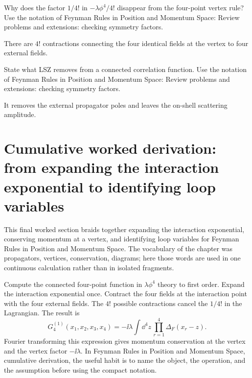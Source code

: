 \begin{exercise}
Why does the factor \(1/4!\) in \(-\lambda\phi^4/4!\) disappear from the four-point vertex rule?  Use the notation of Feynman Rules in Position and Momentum Space: Review problems and extensions: checking symmetry factors.
\begin{answer}
There are \(4!\) contractions connecting the four identical fields at the vertex to four external fields.
\end{answer}
\end{exercise}

\begin{exercise}
State what LSZ removes from a connected correlation function.  Use the notation of Feynman Rules in Position and Momentum Space: Review problems and extensions: checking symmetry factors.
\begin{answer}
It removes the external propagator poles and leaves the on-shell scattering amplitude.
\end{answer}
\end{exercise}



\section{Cumulative worked derivation: from expanding the interaction exponential to identifying loop variables}

This final worked section braids together expanding the interaction exponential, conserving momentum at a vertex, and identifying loop variables for Feynman Rules in Position and Momentum Space.  The vocabulary of the chapter was propagators, vertices, conservation, diagrams; here those words are used in one continuous calculation rather than in isolated fragments.

Compute the connected four-point function in \(\lambda\phi^4\) theory to first order.  Expand the interaction exponential once.  Contract the four fields at the interaction point with the four external fields.  The \(4!\) possible contractions cancel the \(1/4!\) in the Lagrangian.  The result is
\[
  G_4^{(1)}(x_1,x_2,x_3,x_4)=
  -\ii\lambda\int\dd^4z\,\prod_{r=1}^4\Delta_F(x_r-z).
\]
Fourier transforming this expression gives momentum conservation at the vertex and the vertex factor \(-\ii\lambda\).  In Feynman Rules in Position and Momentum Space, cumulative derivation, the useful habit is to name the object, the operation, and the assumption before using the compact notation.

